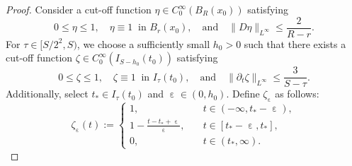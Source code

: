 \documentclass[11pt,oneside, english,reqno,twoside a4paper]{amsart}
\theoremstyle{definition}
\numberwithin{theorem}{section}
\numberwithin{equation}{section}
\begin{document}
\begin{proof}
    Consider a cut-off function $\eta\in C^\infty_0(B_R(x_0))$ satisfying
    $$
    0\leq \eta \leq 1, \quad \eta \equiv 1 \ \text{ in }B_r(x_0),\quad \text{and}\quad \|D\eta\|_{L^\infty}\leq \frac{2}{R-r}.
    $$
    For $\tau \in [S/2^2,S)$, we choose a sufficiently small $h_0>0$ such that there exists a cut-off function $\zeta\in C^\infty_0(I_{S-h_0}(t_0))$ satisfying 
    $$
    0\leq \zeta \leq 1,\quad \zeta\equiv 1 \ \text{ in }I_\tau(t_0),\quad \text{and}\quad \|\partial_t\zeta\|_{L^\infty}\leq \frac{3}{S-\tau}.
    $$
    Additionally, select $t_*\in I_\tau(t_0)$ and $\upepsilon \in (0,h_0)$. Define $\zeta_\upepsilon$ as follows:
    $$
    \zeta_\upepsilon(t):=
    \begin{cases}
        1,&\quad t\in(-\infty,t_*-\upepsilon),\\
        1-\frac{t-t_*+\upepsilon}{\upepsilon},&\quad t\in [t_*-\upepsilon,t_*],\\
        0,&\quad t\in (t_*,\infty).
    \end{cases}
    $$


\end{proof}
\end{document}
